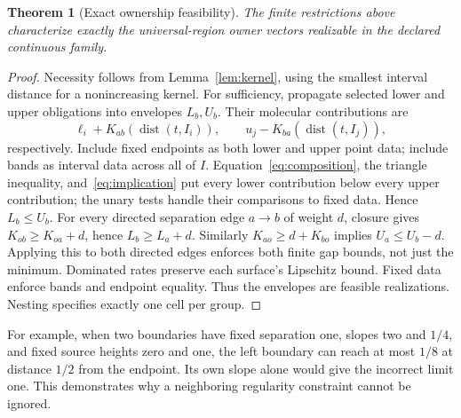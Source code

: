 \documentclass[10pt,letterpaper]{article}
\newtheorem{theorem}{Theorem}
\newcommand{\dist}{\operatorname{dist}}
\begin{document}
\begin{theorem}[Exact ownership feasibility]\label{thm:feas}
The finite restrictions above characterize exactly the universal-region owner vectors realizable in the declared continuous family.
\end{theorem}
\begin{proof}
Necessity follows from Lemma~\ref{lem:kernel}, using the smallest interval distance for a nonincreasing kernel. For sufficiency, propagate selected lower and upper obligations into envelopes $L_b,U_b$. Their molecular contributions are
\[
 \ell_i+K_{ab}(\dist(t,I_i)),\qquad
 u_j-K_{ba}(\dist(t,I_j)),
\]
respectively. Include fixed endpoints as both lower and upper point data; include bands as interval data across all of $I$. Equation~\eqref{eq:composition}, the triangle inequality, and~\eqref{eq:implication} put every lower contribution below every upper contribution; the unary tests handle their comparisons to fixed data. Hence $L_b\le U_b$. For every directed separation edge $a\to b$ of weight $d$, closure gives $K_{ob}\ge K_{oa}+d$, hence $L_b\ge L_a+d$. Similarly $K_{ao}\ge d+K_{bo}$ implies $U_a\le U_b-d$. Applying this to both directed edges enforces both finite gap bounds, not just the minimum. Dominated rates preserve each surface's Lipschitz bound. Fixed data enforce bands and endpoint equality. Thus the envelopes are feasible realizations. Nesting specifies exactly one cell per group.
\end{proof}
For example, when two boundaries have fixed separation one, slopes two and $1/4$, and fixed source heights zero and one, the left boundary can reach at most $1/8$ at distance $1/2$ from the endpoint. Its own slope alone would give the incorrect limit one. This demonstrates why a neighboring regularity constraint cannot be ignored.
\end{document}
